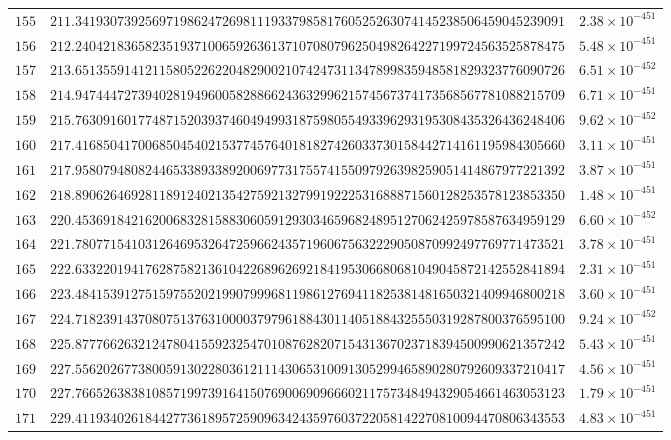 \documentclass[12pt,reqno]{amsart}
\theoremstyle{remark}
\begin{document}
\begin{longtable}{clc}
$155$ & $211.3419307392569719862472698111933798581760525263074145238506459045239091$ & $2.38\times 10^{-451}$ \\
$156$ & $212.2404218365823519371006592636137107080796250498264227199724563525878475$ & $5.48\times 10^{-451}$ \\
$157$ & $213.6513559141211580522622048290021074247311347899835948581829323776090726$ & $6.51\times 10^{-452}$ \\
$158$ & $214.9474447273940281949600582886624363299621574567374173568567781088215709$ & $6.71\times 10^{-451}$ \\
$159$ & $215.7630916017748715203937460494993187598055493396293195308435326436248406$ & $9.62\times 10^{-452}$ \\
$160$ & $217.4168504170068504540215377457640181827426033730158442714161195984305660$ & $3.11\times 10^{-451}$ \\
$161$ & $217.9580794808244653389338920069773175574155097926398259051414867977221392$ & $3.87\times 10^{-451}$ \\
$162$ & $218.8906264692811891240213542759213279919222531688871560128253578123853350$ & $1.48\times 10^{-451}$ \\
$163$ & $220.4536918421620068328158830605912930346596824895127062425978587634959129$ & $6.60\times 10^{-452}$ \\
$164$ & $221.7807715410312646953264725966243571960675632229050870992497769771473521$ & $3.78\times 10^{-451}$ \\
$165$ & $222.6332201941762875821361042268962692184195306680681049045872142552841894$ & $2.31\times 10^{-451}$ \\
$166$ & $223.4841539127515975520219907999681198612769411825381481650321409946800218$ & $3.60\times 10^{-451}$ \\
$167$ & $224.7182391437080751376310000379796188430114051884325550319287800376595100$ & $9.24\times 10^{-452}$ \\
$168$ & $225.8777662632124780415592325470108762820715431367023718394500990621357242$ & $5.43\times 10^{-451}$ \\
$169$ & $227.5562026773800591302280361211143065310091305299465890280792609337210417$ & $4.56\times 10^{-451}$ \\
$170$ & $227.7665263838108571997391641507690069096660211757348494329054661463053123$ & $1.79\times 10^{-451}$ \\
$171$ & $229.4119340261844277361895725909634243597603722058142270810094470806343553$ & $4.83\times 10^{-451}$ \\

\end{longtable}
\end{document}
